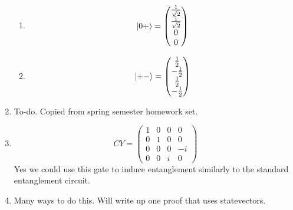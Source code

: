 \documentclass[12pt]{article}
\begin{document}
\begin{enumerate}[font=\bfseries]
\begin{enumerate}
            \item \[\ket{0+} = \begin{pmatrix} \frac{1}{\sqrt{2}} \\ \frac{1}{\sqrt{2}} \\ 0 \\0          \end{pmatrix}\]
            \item \[\ket{+-} = \begin{pmatrix} \frac{1}{2} \\ -\frac{1}{2} \\ \frac{1}{2} \\ -\frac{1}{2}         \end{pmatrix}\]
        \end{enumerate}
    \item To-do. Copied from spring semester homework set.
    \item 
        \[CY = \begin{pmatrix} 
        1 & 0 & 0 & 0 \\
        0 & 1 & 0 & 0 \\
        0 & 0 & 0 & -i \\
        0 & 0 & i & 0
        \end{pmatrix} \]
        Yes we could use this gate to induce entanglement similarly to the standard entanglement circuit.
    \item Many ways to do this. Will write up one proof that uses statevectors.
\end{enumerate}
\end{document}
